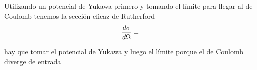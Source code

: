 \documentclass[10pt,oneside]{CBFT_book}
\begin{document}
Utilizando un potencial de Yukawa primero y tomando el límite para llegar al de Coulomb tenemos la sección 
eficaz de Rutherford 
\[
	\frac{d^{\hspace{-0.05em}} {\sigma}}{d {\Omega}^{\hspace{-0.05em}}} = 
\]

hay que tomar el potencial de Yukawa y luego el límite porque el de Coulomb diverge de entrada



\end{document}
